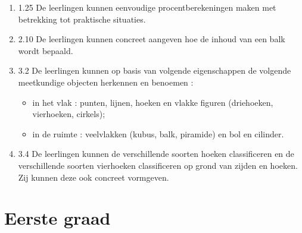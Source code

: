 \documentclass{article}
\begin{document}
\begin{enumerate}
    \item 1.25   De leerlingen kunnen eenvoudige procentberekeningen maken met betrekking tot praktische situaties.
    
    
    \item 2.10   De leerlingen kunnen concreet aangeven hoe de inhoud van een balk wordt bepaald.
    
    \item 3.2    De leerlingen kunnen op basis van volgende eigenschappen de volgende meetkundige objecten herkennen en benoemen :
    \begin{itemize}
        \item in het vlak : punten, lijnen, hoeken en vlakke figuren (driehoeken, vierhoeken, cirkels);
        \item in de ruimte : veelvlakken (kubus, balk, piramide) en bol en cilinder.
    \end{itemize}
        
    
    \item 3.4    De leerlingen kunnen de verschillende soorten hoeken classificeren en de verschillende soorten vierhoeken classificeren op grond van zijden en hoeken. Zij kunnen deze ook concreet vormgeven.
    
\end{enumerate}


\section{Eerste graad}
    
\end{document}
